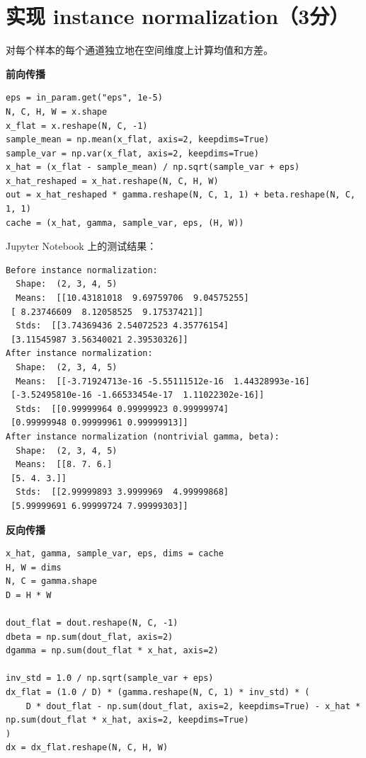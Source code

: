 \section{实现 instance normalization（3分）}

对每个样本的每个通道独立地在空间维度上计算均值和方差。

\textbf{前向传播}

\begin{lstlisting}[style=cleanpython]
eps = in_param.get("eps", 1e-5)
N, C, H, W = x.shape
x_flat = x.reshape(N, C, -1)
sample_mean = np.mean(x_flat, axis=2, keepdims=True)
sample_var = np.var(x_flat, axis=2, keepdims=True)
x_hat = (x_flat - sample_mean) / np.sqrt(sample_var + eps)
x_hat_reshaped = x_hat.reshape(N, C, H, W)
out = x_hat_reshaped * gamma.reshape(N, C, 1, 1) + beta.reshape(N, C, 1, 1)
cache = (x_hat, gamma, sample_var, eps, (H, W))
\end{lstlisting}

Jupyter Notebook 上的测试结果：

\begin{lstlisting}[style=cleanpython]
Before instance normalization:
  Shape:  (2, 3, 4, 5)
  Means:  [[10.43181018  9.69759706  9.04575255]
 [ 8.23746609  8.12058525  9.17537421]]
  Stds:  [[3.74369436 2.54072523 4.35776154]
 [3.11545987 3.56340021 2.39530326]]
After instance normalization:
  Shape:  (2, 3, 4, 5)
  Means:  [[-3.71924713e-16 -5.55111512e-16  1.44328993e-16]
 [-3.52495810e-16 -1.66533454e-17  1.11022302e-16]]
  Stds:  [[0.99999964 0.99999923 0.99999974]
 [0.99999948 0.99999961 0.99999913]]
After instance normalization (nontrivial gamma, beta):
  Shape:  (2, 3, 4, 5)
  Means:  [[8. 7. 6.]
 [5. 4. 3.]]
  Stds:  [[2.99999893 3.9999969  4.99999868]
 [5.99999691 6.99999724 7.99999303]]
\end{lstlisting}

\textbf{反向传播}

\begin{lstlisting}[style=cleanpython]
x_hat, gamma, sample_var, eps, dims = cache
H, W = dims
N, C = gamma.shape
D = H * W

dout_flat = dout.reshape(N, C, -1)
dbeta = np.sum(dout_flat, axis=2)
dgamma = np.sum(dout_flat * x_hat, axis=2)

inv_std = 1.0 / np.sqrt(sample_var + eps)
dx_flat = (1.0 / D) * (gamma.reshape(N, C, 1) * inv_std) * (
    D * dout_flat - np.sum(dout_flat, axis=2, keepdims=True) - x_hat * np.sum(dout_flat * x_hat, axis=2, keepdims=True)
)
dx = dx_flat.reshape(N, C, H, W)
\end{lstlisting}

